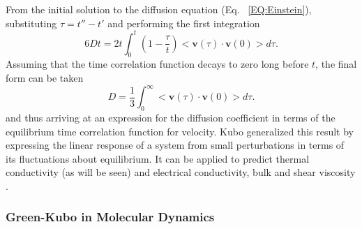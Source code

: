 %
From the initial solution to the diffusion equation (Eq. ~\ref{EQ:Einstein}), substituting $\tau=t''-t'$ and performing the first integration
%
\begin{equation}
6Dt=2t\int_0^t\left(1-\frac{\tau}{t}\right)<\bm{v}(\tau)\cdot\bm{v}(0)>d\tau.
\end{equation}
%
Assuming that the time correlation function decays to zero long before $t$, the final form can be taken
%
\begin{equation}
D=\frac{1}{3}\int_0^{\infty}<\bm{v}(\tau)\cdot\bm{v}(0)>d\tau.
\end{equation}
%
and thus arriving at an expression for the diffusion coefficient in terms of the equilibrium time correlation function for velocity. Kubo generalized this result by expressing the linear response of a system from small perturbations in terms of its fluctuations about equilibrium. It can be applied to predict thermal conductivity (as will be seen)\cite{PhysRevB.61.2651} and electrical conductivity, \cite{zwanzig1965time} bulk and shear viscosity \cite{hoover1980lennard}.

\subsubsection {Green-Kubo in Molecular Dynamics}


